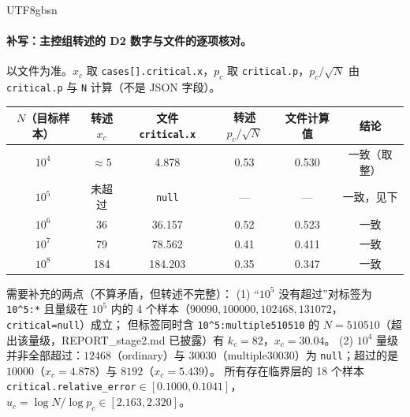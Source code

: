 \documentclass[11pt,a4paper]{article}
\theoremstyle{plain}
\theoremstyle{definition}
\begin{document}
\begin{CJK}{UTF8}{gbsn}
\paragraph{补写：主控组转述的 D2 数字与文件的逐项核对。}
以文件为准。$x_c$ 取 \texttt{cases[].critical.x}，$p_c$ 取 \texttt{critical.p}，$p_c/\sqrt N$ 由 \texttt{critical.p} 与 \texttt{N} 计算（不是 JSON 字段）。
\begin{center}
\small
\begin{tabular}{c|cc|cc|c}
\hline
$N$（目标样本） & 转述 $x_c$ & 文件 \texttt{critical.x} & 转述 $p_c/\sqrt N$ & 文件计算值 & 结论\\
\hline
$10^4$ & $\approx5$ & 4.878 & 0.53 & 0.530 & 一致（取整）\\
$10^5$ & 未超过 & \texttt{null} & — & — & 一致，见下\\
$10^6$ & 36 & 36.157 & 0.52 & 0.523 & 一致\\
$10^7$ & 79 & 78.562 & 0.41 & 0.411 & 一致\\
$10^8$ & 184 & 184.203 & 0.35 & 0.347 & 一致\\
\hline
\end{tabular}
\end{center}
需要补充的两点（不算矛盾，但转述不完整）：
(1) “$10^5$ 没有超过”对标签为 \texttt{10\^{}5:*} 且量级在 $10^5$ 内的 4 个样本（$90090,100000,102468,131072$，\texttt{critical=null}）成立；
但标签同时含 \texttt{10\^{}5:multiple510510} 的 $N=510510$（超出该量级，REPORT\_stage2.md 已披露）有 $k_c=82$，$x_c=30.04$。
(2) $10^4$ 量级并非全部超过：$12468$（ordinary）与 $30030$（multiple30030）为 \texttt{null}；超过的是 $10000$（$x_c=4.878$）与 $8192$（$x_c=5.439$）。
所有存在临界层的 18 个样本 \texttt{critical.relative\_error}$\in[0.1000,0.1041]$，$u_c=\log N/\log p_c\in[2.163,2.320]$。


\end{CJK}
\end{document}
